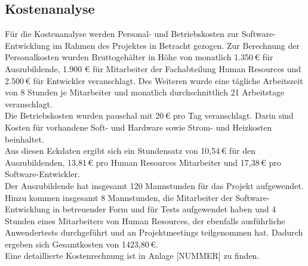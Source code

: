 \subsection{Kostenanalyse}
    Für die Kostenanalyse werden Personal- und Betriebskosten zur Software-Entwicklung im Rahmen des Projektes in Betracht gezogen. Zur Berechnung der Personalkosten wurden Bruttogehälter in Höhe von monatlich 1.350\,€ für Auszubildende, 1.900 € für Mitarbeiter der Fachabteilung Human Resources und 2.500\,€ für Entwickler veranschlagt. Des Weiteren wurde eine tägliche Arbeitszeit von 8 Stunden je Mitarbeiter und monatlich durchschnittlich 21 Arbeitstage veranschlagt.\\
    Die Betriebskosten wurden pauschal mit 20\,€ pro Tag veranschlagt. Darin sind Kosten für vorhandene Soft- und Hardware sowie Strom- und Heizkosten beinhaltet.\\
    Aus diesen Eckdaten ergibt sich ein Stundensatz von 10,54\,€ für den Auszubildenden, 13,81\,€ pro Human Resources Mitarbeiter und 17,38\,€ pro Software-Entwickler.\\
    Der Auszubildende hat insgesamt 120 Mannstunden für das Projekt aufgewendet. Hinzu kommen insgesamt 8 Mannstunden, die Mitarbeiter der Software-Entwicklung in betreuender Form und für Tests aufgewendet haben und 4 Stunden eines Mitarbeiters von Human Resources, der ebenfalls ausführliche Anwendertests durchgeführt und an Projektmeetings teilgenommen hat. Dadurch ergeben sich Gesamtkosten von 1423,80\,€.\\
    Eine detaillierte Kostenrechnung ist in Anlage [NUMMER] zu finden.

